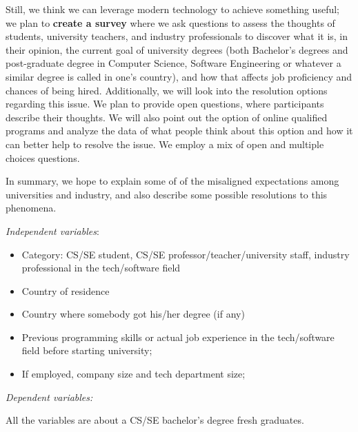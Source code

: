 \documentclass{sigchi}
\begin{document}
Still, we think we can leverage modern technology to achieve something useful; we plan to \textbf{create a survey} where we ask questions to assess the thoughts of students, university teachers, and industry professionals to discover what it is, in their opinion, the current goal of university degrees (both Bachelor's degrees and post-graduate degree in Computer Science, Software Engineering or whatever a similar degree is called in one's country), and how that affects job proficiency and chances of being hired. Additionally, we will look into the resolution options regarding this issue. We plan to provide open questions, where participants describe their thoughts. We will also point out the option of online qualified programs and analyze the data of what people think about this option and how it can better help to resolve the issue. We employ a mix of open and multiple choices questions.

In summary, we hope to explain some of of the misaligned expectations among universities and industry, and also describe some possible resolutions to this phenomena. 

\textit{Independent variables}:
\begin{itemize}
	\item Category: CS/SE student, CS/SE professor/teacher/university staff, industry professional in the tech/software field
	\item Country of residence
	\item Country where somebody got his/her degree (if any)
	\item Previous programming skills or actual job experience in the tech/software field before starting university;
	\item If employed, company size and tech department size;
\end{itemize}

\textit{Dependent variables:}

All the variables are about a CS/SE bachelor's degree fresh graduates.
\end{document}

